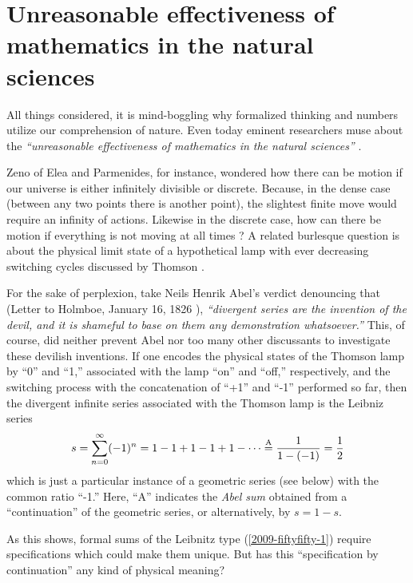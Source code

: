 \chapter{Unreasonable effectiveness of mathematics in the natural sciences}
\label{ch:uens}

All things considered, it is mind-boggling why formalized thinking and numbers utilize our comprehension
of nature.
Even today eminent researchers muse about the {\em
``unreasonable effectiveness of mathematics in the natural sciences''} \cite{wigner}.



Zeno of Elea and Parmenides, for instance, wondered how there can be motion if
our universe is either infinitely divisible or discrete.
Because, in the dense case (between any two points there is another point),
the slightest finite move would require an infinity of actions.
Likewise in the discrete case,
how can there be motion if everything is not moving at all times \cite{zeno,benna:62,gruenbaum:68,Sainsbury}?
A related burlesque question is
about the physical limit state of a hypothetical lamp with ever decreasing switching cycles
discussed by Thomson \cite{thom:54}.

For the sake of perplexion, take
Neils Henrik Abel's verdict denouncing that
(Letter to Holmboe, January 16, 1826 \cite{Hardy:1949}),
{\em ``divergent series are the invention of the devil, and it is shameful to base on them any demonstration whatsoever.''}
This, of course, did neither prevent Abel nor too many other discussants to investigate these devilish inventions.
If one encodes the physical states of the Thomson lamp by ``0'' and ``1,''
associated with the lamp ``on'' and ``off,'' respectively,
and the switching process with the concatenation of ``+1'' and ``-1'' performed so far, then
the divergent infinite series associated with the Thomson lamp is
the Leibniz series
\begin{equation}
s = \sum_{n=0}^\infty (-1)^n=1-1+1-1+1-\cdots \stackrel{{\rm A}}{=} \frac{1}{1-(-1)}= \frac{1}{2}
\label{2009-fiftyfifty-1}
\end{equation}
which is just a particular instance of a geometric series (see below) with the common ratio ``-1.''
Here, ``A'' indicates the
{\em  Abel sum}
\cite{Hardy:1949} obtained from a ``continuation'' of the geometric series, or alternatively, by
$s= 1-s$.

As this shows, formal sums of the Leibnitz type (\ref{2009-fiftyfifty-1}) require specifications
which could make them unique.
But has this ``specification by continuation'' any kind of physical meaning?

